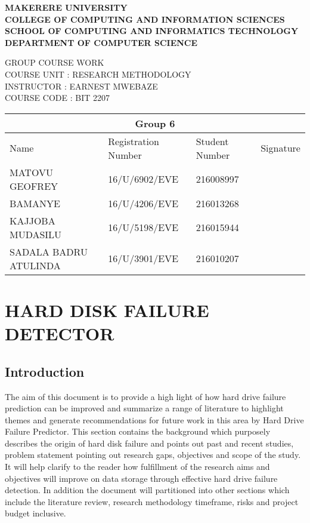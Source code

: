 \documentclass{article}
\begin{document}
	\begin{center}
		{\huge\textbf{MAKERERE UNIVERSITY}}\\
		{\large\textbf{COLLEGE OF COMPUTING AND INFORMATION SCIENCES}}\\
		\textbf{SCHOOL OF COMPUTING AND INFORMATICS TECHNOLOGY}\\
		\textbf{DEPARTMENT OF COMPUTER SCIENCE}
	\end{center}
	GROUP COURSE WORK\\
	COURSE UNIT : RESEARCH METHODOLOGY\\
	INSTRUCTOR : EARNEST MWEBAZE\\
	COURSE CODE : BIT 2207\\



\begin{tabular}{|p{5cm} |p{3cm}|p{3cm}|p{3cm}|}
\hline
\multicolumn{4}{|c|}{Group 6}\\
\hline
\hline
Name & Registration Number & Student Number&Signature\\
\hline
MATOVU GEOFREY&16/U/6902/EVE&216008997&\\
BAMANYE&16/U/4206/EVE&216013268&\\
KAJJOBA MUDASILU&16/U/5198/EVE&216015944&\\
SADALA BADRU ATULINDA&16/U/3901/EVE&216010207\\
\hline

\end{tabular}
\section{HARD DISK FAILURE DETECTOR}
\subsection{Introduction}
The aim of this document is to provide a high light of how hard drive failure prediction can be improved and summarize a range of literature to highlight themes and generate recommendations for future work in this area by Hard Drive Failure Predictor. This section contains the background which purposely describes the origin of hard disk failure and points out past and recent studies, problem statement pointing out research gaps, objectives and scope of the study. It will help clarify to the reader how fulfillment of the research aims and objectives will improve on data storage through effective hard drive failure detection. In addition the document will partitioned into other sections which include the literature review, research methodology timeframe, risks and project budget inclusive.  
\end{document}
